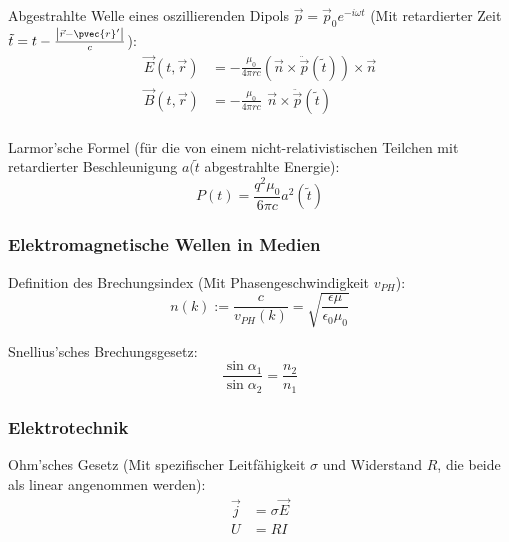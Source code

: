 \documentclass[11pt]{article}
\numberwithin{equation}{section}
\begin{document}
        Abgestrahlte Welle eines oszillierenden Dipols $\vec{p} = \vec{p}_0 e^{-i\omega t}$ (Mit retardierter Zeit $\tilde{t} = t-\frac{\left|\vec{r}-\pvec{r}'\right|}{c}$):
        \begin{equation}
          \begin{aligned}
            \vec{E}(t,\vec{r}) &= -\frac{\mu_0}{4\pi r c}  \left(\vec{n}\times\ddot{\vec{p}}(\tilde{t})\right) \times \vec{n} \\
            \vec{B}(t,\vec{r}) &= -\frac{\mu_0}{4\pi r c} \phantom{\Big(}\vec{n}\times\ddot{\vec{p}}(\tilde{t}) \\
          \end{aligned}
        \end{equation}

        Larmor'sche Formel (für die von einem nicht-relativistischen Teilchen mit retardierter Beschleunigung $a(\tilde{t}$ abgestrahlte Energie):
        \begin{equation}
          P(t) = \frac{q^2 \mu_0}{6\pi c}a^2(\tilde{t})
        \end{equation}

      \subsubsection{Elektromagnetische Wellen in Medien}
        Definition des Brechungsindex (Mit Phasengeschwindigkeit $v_{PH}$):
        \begin{equation}
          n(k) := \frac{c}{v_{PH}(k)} = \sqrt{\frac{\epsilon\mu}{\epsilon_0\mu_0}}
        \end{equation}

        Snellius'sches Brechungsgesetz:
        \begin{equation}
          \frac{\sin\alpha_1}{\sin\alpha_2} = \frac{n_2}{n_1}
        \end{equation}



      \subsubsection{Elektrotechnik}
        Ohm'sches Gesetz (Mit spezifischer Leitfähigkeit $\sigma$ und Widerstand $R$, die beide als linear angenommen werden):
        \begin{equation}
          \begin{aligned}
            \vec{j} &= \sigma\vec{E} \\
            U &= R I
          \end{aligned}
        \end{equation}
\end{document}

